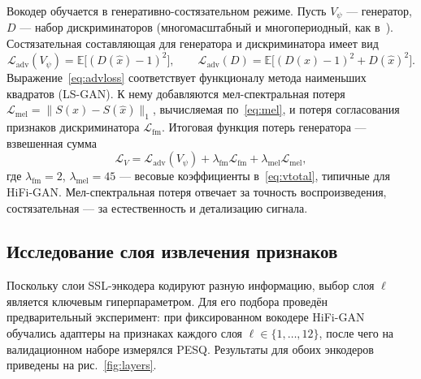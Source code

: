 Вокодер обучается в генеративно-состязательном режиме. Пусть $V_\psi$ ---
генератор, $D$ --- набор дискриминаторов (многомасштабный и многопериодный, как
в~\cite{hifigan}). Состязательная составляющая для генератора и дискриминатора
имеет вид
\begin{equation}
    \mathcal{L}_{\text{adv}}(V_\psi) = \mathbb{E}\big[(D(\hat{x})-1)^2\big],
    \qquad
    \mathcal{L}_{\text{adv}}(D) = \mathbb{E}\big[(D(x)-1)^2 + D(\hat{x})^2\big].
    \label{eq:advloss}
\end{equation}
Выражение~\eqref{eq:advloss} соответствует функционалу метода наименьших
квадратов (LS-GAN). К нему добавляются мел-спектральная потеря
$\mathcal{L}_{\text{mel}} = \|S(x)-S(\hat{x})\|_1$, вычисляемая по~\eqref{eq:mel},
и потеря согласования признаков дискриминатора $\mathcal{L}_{\text{fm}}$. Итоговая
функция потерь генератора --- взвешенная сумма
\begin{equation}
    \mathcal{L}_{V} = \mathcal{L}_{\text{adv}}(V_\psi)
    + \lambda_{\text{fm}}\mathcal{L}_{\text{fm}}
    + \lambda_{\text{mel}}\mathcal{L}_{\text{mel}},
    \label{eq:vtotal}
\end{equation}
где $\lambda_{\text{fm}}=2$, $\lambda_{\text{mel}}=45$ --- весовые коэффициенты
в~\eqref{eq:vtotal}, типичные для HiFi-GAN. Мел-спектральная потеря отвечает за точность
воспроизведения, состязательная --- за естественность и детализацию сигнала.

\subsection{Исследование слоя извлечения признаков}
\label{ssec:layers}

Поскольку слои SSL-энкодера кодируют разную информацию, выбор слоя $\ell$
является ключевым гиперпараметром. Для его подбора проведён предварительный
эксперимент: при фиксированном вокодере HiFi-GAN обучались адаптеры на признаках
каждого слоя $\ell\in\{1,\dots,12\}$, после чего на валидационном наборе
измерялся PESQ. Результаты для обоих энкодеров приведены на
рис.~\ref{fig:layers}.

